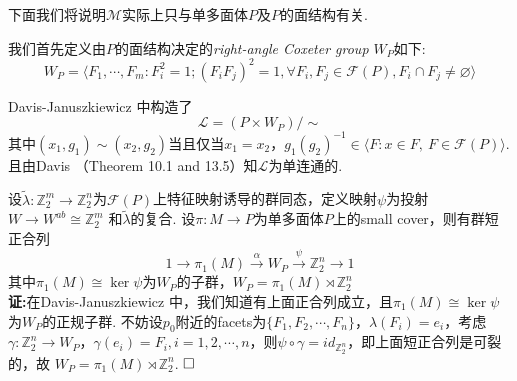 \documentclass{article}
\theoremstyle{plain}%
\theoremstyle{definition}
\theoremstyle{remark}
\begin{document}
下面我们将说明$\mathcal{M}$实际上只与单多面体$P$及$P$的面结构有关. 

我们首先定义由$P$的面结构决定的{\em right-angle Coxeter group $W_P$}如下:
$$W_P=\langle F_1,\cdots,F_m:F_i^2=1; (F_iF_j)^2=1, \forall F_i,F_j\in \mathcal{F}(P),F_i\cap F_j\neq \varnothing\rangle$$

Davis-Januszkiewicz \cite{DJ1} 中构造了
\begin{equation}\label{eq6}
\mathcal{L}=(P\times W_P)/\sim
\end{equation}
其中$(x_1,g_1)\sim (x_2,g_2)$当且仅当$x_1=x_2$，$g_1(g_2)^{-1}\in \langle F:x\in F,~F\in\mathcal{F}(P)\rangle$. 且由Davis \cite{D1}（Theorem 10.1 and 13.5）知$\mathcal{L}$为单连通的.%


设$\widetilde{\lambda}:\mathbb{Z}_2^m\longrightarrow \mathbb{Z}_2^n$为$\mathcal{F}(P)$上特征映射诱导的群同态，定义映射$\psi$为投射$W\longrightarrow W^{ab}\cong \mathbb{Z}_2^m$
和$\widetilde{\lambda}$的复合.
{\lem \label{lem1}设$\pi:M\longrightarrow P$为单多面体$P$上的small cover，则有群短正合列
\begin{equation}\label{exact}
1 \longrightarrow \pi_1(M)\overset{\alpha}{\longrightarrow}W_P\overset{\psi}{\longrightarrow}\mathbb{Z}_2^n \longrightarrow  1
\end{equation}
其中$\pi_1(M)\cong \ker\psi$为$W_P$的子群，$W_P=\pi_1(M)\rtimes \mathbb{Z}_2^n$}\\
{\bf 证:}在Davis-Januszkiewicz \cite{DJ1}中，我们知道有上面正合列成立，且$\pi_1(M)\cong \ker \psi$为$W_P$的正规子群. 不妨设$p_0$附近的facets为$\{F_1,F_2,\cdots,F_n\}$，$\lambda(F_i)=e_i$，考虑$\gamma:\mathbb{Z}_2^n\longrightarrow W_P$，$\gamma(e_i)=F_i, i=1,2,\cdots,n$，则$\psi\circ\gamma=id_{\mathbb{Z}_2^n}$，即上面短正合列是可裂的，故 $W_P=\pi_1(M)\rtimes \mathbb{Z}_2^n$.  $\hfill{} \Box$
\end{document}
